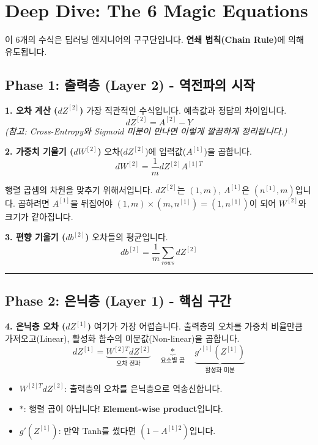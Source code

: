 \documentclass[11pt,a4paper]{book}
\theoremstyle{definition}
\begin{document}
\section{Deep Dive: The 6 Magic Equations}

이 6개의 수식은 딥러닝 엔지니어의 구구단입니다. \textbf{연쇄 법칙(Chain Rule)}에 의해 유도됩니다.

\subsection{Phase 1: 출력층 (Layer 2) - 역전파의 시작}

\textbf{1. 오차 계산 ($dZ^{[2]}$)}
가장 직관적인 수식입니다. 예측값과 정답의 차이입니다.
$$ dZ^{[2]} = A^{[2]} - Y $$
\textit{(참고: Cross-Entropy와 Sigmoid 미분이 만나면 이렇게 깔끔하게 정리됩니다.)}

\textbf{2. 가중치 기울기 ($dW^{[2]}$)}
오차($dZ^{[2]}$)에 입력값($A^{[1]}$)을 곱합니다.
$$ dW^{[2]} = \frac{1}{m} dZ^{[2]} A^{[1]T} $$
\begin{warningbox}[title={왜 전치($T$)를 하나요?}]
행렬 곱셈의 차원을 맞추기 위해서입니다.
$dZ^{[2]}$는 $(1, m)$, $A^{[1]}$은 $(n^{[1]}, m)$입니다. 곱하려면 $A^{[1]}$을 뒤집어야 $(1, m) \times (m, n^{[1]}) = (1, n^{[1]})$이 되어 $W^{[2]}$와 크기가 같아집니다.
\end{warningbox}

\textbf{3. 편향 기울기 ($db^{[2]}$)}
오차들의 평균입니다.
$$ db^{[2]} = \frac{1}{m} \sum_{rows} dZ^{[2]} $$

\vspace{0.5cm}\hrule\vspace{0.5cm}

\subsection{Phase 2: 은닉층 (Layer 1) - 핵심 구간}

\textbf{4. 은닉층 오차 ($dZ^{[1]}$)}
여기가 가장 어렵습니다. 출력층의 오차를 가중치 비율만큼 가져오고(Linear), 활성화 함수의 미분값(Non-linear)을 곱합니다.
$$ dZ^{[1]} = \underbrace{W^{[2]T} dZ^{[2]}}_{\text{오차 전파}} \quad \underbrace{*}_{\text{요소별 곱}} \quad \underbrace{g'^{[1]}(Z^{[1]})}_{\text{활성화 미분}} $$

\begin{itemize}
    \item $W^{[2]T} dZ^{[2]}$: 출력층의 오차를 은닉층으로 역송신합니다.
    \item $*$: 행렬 곱이 아닙니다! \textbf{Element-wise product}입니다.
    \item $g'(Z^{[1]})$: 만약 Tanh를 썼다면 $(1 - A^{[1]2})$입니다.
\end{itemize}
\end{document}
